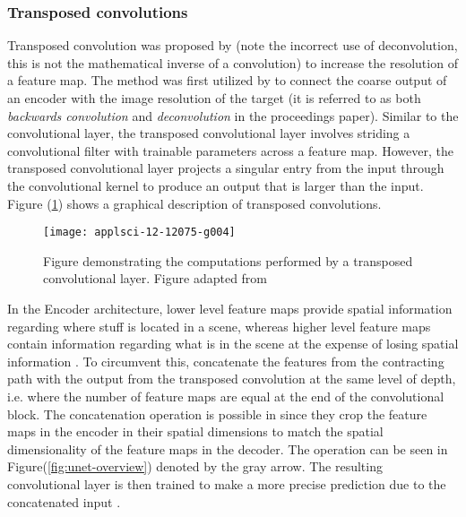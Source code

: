 \documentclass[../main/thesis.tex]{subfiles}
\begin{document}
\subsubsection{Transposed convolutions}
\label{sec:tconv}
Transposed convolution was proposed by \citet{Zeiler2010} (note the incorrect use of deconvolution, this is not the mathematical inverse of a convolution) to increase the resolution of a feature map. The method was first utilized by \citet{Long2015} to connect the coarse output of an encoder with the image resolution of the target (it is referred to as both \textit{backwards convolution} and \textit{deconvolution} in the proceedings paper). Similar to the convolutional layer, the transposed convolutional layer involves striding a convolutional filter with trainable parameters across a feature map. However, the transposed convolutional layer projects a singular entry from the input through the convolutional kernel to produce an output that is larger than the input. Figure (\ref{fig:tconv}) shows a graphical description of transposed convolutions.

\begin{figure}
    \centering
    \texttt{[image: applsci-12-12075-g004]}
    \caption{\label{fig:tconv}Figure demonstrating the computations performed by a transposed convolutional layer. Figure adapted from \protect\citep{Wu2022}}
\end{figure}

In the Encoder architecture, lower level feature maps provide spatial information regarding where stuff is located in a scene, whereas higher level feature maps contain information regarding what is in the scene at the expense of losing spatial information \citep{Long2015}. To circumvent this, \citet{Ronneberger2015} concatenate the features from the contracting path with the output from the transposed convolution at the same level of depth, i.e. where the number of feature maps are equal at the end of the convolutional block. The concatenation operation is possible in \citet{Ronneberger2015} since they crop the feature maps in the encoder in their spatial dimensions to match the spatial dimensionality of the feature maps in the decoder. The operation can be seen in Figure(\ref{fig:unet-overview}) denoted by the gray arrow. The resulting convolutional layer is then trained to make a more precise prediction due to the concatenated input \citep{Ronneberger2015}.
\end{document}

